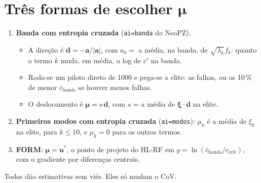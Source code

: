 \documentclass[11pt,a4paper]{article}
\begin{document}
\section{Três formas de escolher \texorpdfstring{$\bm\mu$}{mu}}
\begin{enumerate}
  \item \textbf{Banda com entropia cruzada} (\texttt{ai=banda} do NeoPZ).
    \begin{itemize}
      \item A direção é $\bm d = -\bm a/|\bm a|$, com $a_k = $ a média, na banda, de $\sqrt{\lambda_k} f_k$: quanto o
        termo $k$ muda, em média, o log de $c'$ na banda.
      \item Roda-se um piloto direto de 1000 e pega-se a elite: as falhas, ou os 10\,\% de menor
        $\bar c_{\text{banda}}$ se houver menos falhas.
      \item O deslocamento é $\bm\mu = s\,\bm d$, com $s$ = a média de $\bm\xi\cdot\bm d$ na elite.
    \end{itemize}
  \item \textbf{Primeiros modos com entropia cruzada} (\texttt{ai=modos}): $\mu_k$ é a média de $\xi_k$ na elite, para
    $k \le 10$, e $\mu_k = 0$ para os outros termos.
  \item \textbf{FORM}: $\bm\mu = \bm u^*$, o ponto de projeto do HL-RF em $g = \ln(\bar c_{\text{banda}}/c_{\text{crit}})$,
    com o gradiente por diferenças centrais.
\end{enumerate}
Todos dão estimativas sem viés. Eles só mudam o CoV.
\end{document}
